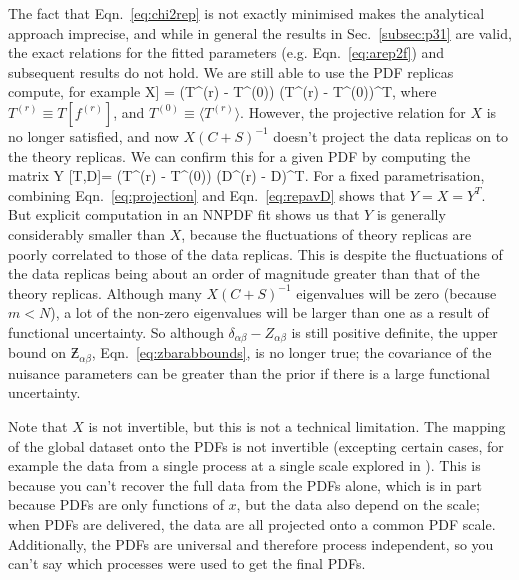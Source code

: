 The fact that Eqn.~\ref{eq:chi2rep} is not exactly minimised makes the analytical approach imprecise, and while in general the results in Sec.~\ref{subsec:p31} are valid, the exact relations for the fitted parameters (e.g. Eqn.~\ref{eq:arep2f}) and subsequent results do not hold. We are still able to use the PDF replicas compute, for example
\be
X\equiv\Cov[T[f]] = \langle (T^{(r)} - T^{(0)}) (T^{(r)} - T^{(0)})^T\rangle,
\label{eq:Xdefgen}
\ee
where $T^{(r)}\equiv T[f^{(r)}]$, and $T^{(0)}\equiv \langle T^{(r)}\rangle$. However, the projective relation for $X$ is no longer satisfied, and now $X(C+S)^{-1}$ doesn't project the data replicas on to the theory replicas. We can confirm this for a given PDF by computing the matrix
\be
Y [T,D]= \langle (T^{(r)} - T^{(0)}) (D^{(r)} - D)^T\rangle.
\label{eq:YdefNN}
\ee
For a fixed parametrisation, combining Eqn.~\ref{eq:projection} and Eqn.~\ref{eq:repavD} shows that $Y=X=Y^T$. But explicit computation in an NNPDF fit shows us that $Y$ is generally considerably smaller than $X$, because the fluctuations of theory replicas are poorly correlated to those of the data replicas. This is despite the fluctuations of the data replicas being about an order of magnitude greater than that of the theory replicas. Although many $X(C+S)^{-1}$ eigenvalues will be zero (because $m < N$), a lot of the non-zero eigenvalues will be larger than one as a result of functional uncertainty. So although $\delta_{\alpha\beta}-Z_{\alpha\beta}$ is still positive definite, the upper bound on $\Zbar_{\alpha\beta}$, Eqn.~\ref{eq:zbarabbounds}, is no longer true; the covariance of the nuisance parameters can be greater than the prior if there is a large functional uncertainty. 

Note that $X$ is not invertible, but this is not a technical limitation. The mapping of the global dataset onto the PDFs is not invertible (excepting certain cases, for example the data from a single process at a single scale explored in \cite{Harland-Lang:2018bxd}). This is because you can't recover the full data from the PDFs alone, which is in part because PDFs are only functions of $x$, but the data also depend on the scale; when PDFs are delivered, the data are all projected onto a common PDF scale. Additionally, the PDFs are universal and therefore process independent, so you can't say which processes were used to get the final PDFs. 

